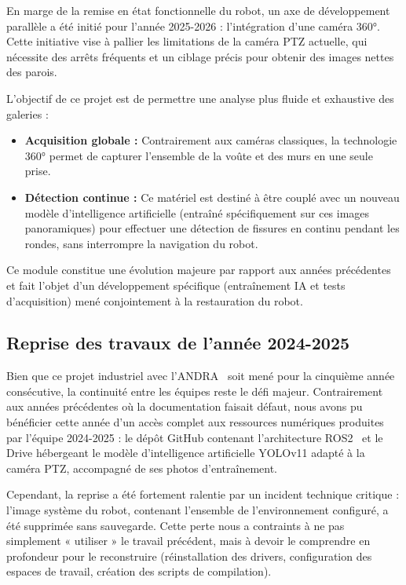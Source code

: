 \documentclass[12pt,a4paper]{article}
\begin{document}
En marge de la remise en état fonctionnelle du robot, un axe de développement parallèle a été initié pour l'année 2025-2026 : l'intégration d'une caméra 360°. Cette initiative vise à pallier les limitations de la caméra PTZ actuelle, qui nécessite des arrêts fréquents et un ciblage précis pour obtenir des images nettes des parois.

L'objectif de ce projet est de permettre une analyse plus fluide et exhaustive des galeries :
\begin{itemize}
    \item \textbf{Acquisition globale :} Contrairement aux caméras classiques, la technologie 360° permet de capturer l'ensemble de la voûte et des murs en une seule prise.
    \item \textbf{Détection continue :} Ce matériel est destiné à être couplé avec un nouveau modèle d'intelligence artificielle (entraîné spécifiquement sur ces images panoramiques) pour effectuer une détection de fissures en continu pendant les rondes, sans interrompre la navigation du robot.
\end{itemize}

Ce module constitue une évolution majeure par rapport aux années précédentes et fait l'objet d'un développement spécifique (entraînement IA et tests d'acquisition) mené conjointement à la restauration du robot.

\vspace{2cm}

\subsection{Reprise des travaux de l'année 2024-2025}

Bien que ce projet industriel avec l'ANDRA~\cite{andra_cigeo} soit mené pour la cinquième année consécutive, la continuité entre les équipes reste le défi majeur. Contrairement aux années précédentes où la documentation faisait défaut, nous avons pu bénéficier cette année d'un accès complet aux ressources numériques produites par l'équipe 2024-2025 : le dépôt GitHub contenant l'architecture ROS2~\cite{ros2} et le Drive hébergeant le modèle d'intelligence artificielle YOLOv11 adapté à la caméra PTZ, accompagné de ses photos d'entraînement.

Cependant, la reprise a été fortement ralentie par un incident technique critique : l'image système du robot, contenant l'ensemble de l'environnement configuré, a été supprimée sans sauvegarde. Cette perte nous a contraints à ne pas simplement « utiliser » le travail précédent, mais à devoir le comprendre en profondeur pour le reconstruire (réinstallation des drivers, configuration des espaces de travail, création des scripts de compilation).
\end{document}
